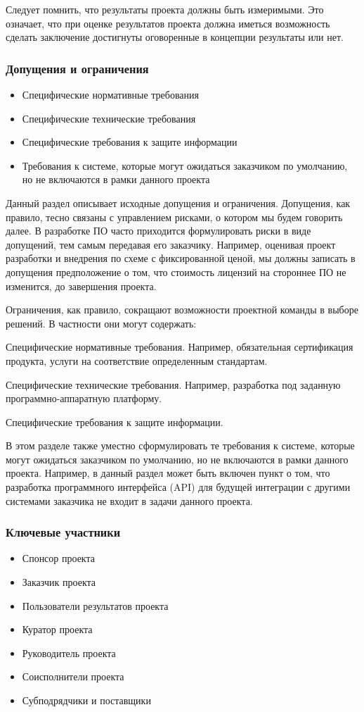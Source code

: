 \documentclass{../industrial-development}
\begin{document}
Следует помнить, что результаты проекта должны быть измеримыми. Это означает, что при оценке результатов проекта должна иметься возможность сделать заключение достигнуты оговоренные в концепции результаты или нет.

    \begin{frame} \frametitle{Допущения и ограничения}
	\begin{itemize}
		\item Специфические нормативные требования
		\item Специфические технические требования
		\item Специфические требования к защите информации
		\item Требования к системе, которые могут ожидаться заказчиком по умолчанию, но не включаются в рамки данного проекта
	\end{itemize}
    \end{frame}
    \lecturenotes

Данный раздел описывает исходные допущения и ограничения. Допущения, как правило, тесно связаны с управлением рисками, о котором мы будем говорить далее. В разработке ПО часто приходится формулировать риски в виде допущений, тем самым передавая его заказчику. Например, оценивая проект разработки и внедрения по схеме с фиксированной ценой, мы должны записать в допущения предположение о том, что стоимость лицензий на стороннее ПО не изменится, до завершения проекта.

Ограничения, как правило, сокращают возможности проектной команды в выборе решений. В частности они могут содержать:

Специфические нормативные требования. Например, обязательная сертификация продукта, услуги на соответствие определенным стандартам.

Специфические технические требования. Например, разработка под заданную программно-аппаратную платформу.

Специфические требования к защите информации.

В этом разделе также уместно сформулировать те требования к системе, которые могут ожидаться заказчиком по умолчанию, но не включаются в рамки данного проекта. Например, в данный раздел может быть включен пункт о том, что разработка программного интерфейса (API) для будущей интеграции с другими системами заказчика не входит в задачи данного проекта.

    \begin{frame} \frametitle{Ключевые участники}
	\begin{itemize}
		\item Спонсор проекта 
		\item Заказчик проекта
		\item Пользователи результатов проекта
		\item Куратор проекта
		\item Руководитель проекта
		\item Соисполнители проекта
		\item Субподрядчики и поставщики
	\end{itemize}
    \end{frame}
    \lecturenotes
\end{document}
